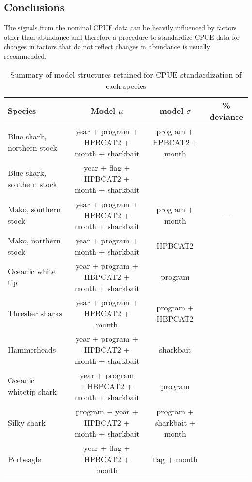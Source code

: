 \subsection{Conclusions}
The signals from the nominal  CPUE data can be heavily influenced by factors other than abundance and therefore a procedure to standardize CPUE data for changes in factors  that do not reflect changes in abundance is usually recommended. 

\clearpage
\begin{landscape}
\thispagestyle{empty}
 
\begin{table}[!h]
\caption{Summary of model structures retained for CPUE standardization of each species}
\begin{center}
\begin{tabular}{l|c|c|c}
Species & Model $\mu$& model $\sigma$ & \% deviance\\
\hline
\hline
Blue shark, northern stock  & year + program + HPBCAT2 + month + sharkbait & program + HPBCAT2 + month&\\
Blue shark, southern stock & year + flag + HPBCAT2 + month + sharkbait & \\ 
Mako, southern stock & year + program + HPBCAT2 + month + sharkbait & program + month & ---\\
Mako, northern stock & year + program + month + sharkbait & HPBCAT2 \\
Oceanic white tip & year + program + HBPCAT2 + month + sharkbait & program \\
Thresher sharks& year + program + HPBCAT2 + month & program + HBPCAT2 \\
Hammerheads& year + program + HPBCAT2 + month + sharkbait & sharkbait \\
Oceanic whitetip shark& year + program +HBPCAT2 + month + sharkbait & program\\
Silky shark & program + year + HPBCAT2 + month + sharkbait & program + sharkbait + month\\
Porbeagle & year + flag + HPBCAT2 + month & flag + month\\ 

\end{tabular}
\end{center}
\end{table}
\end{landscape}


\BSHnorthaic
\BSHsouthaic
\FALaic
\HHDaic
\MAKnorthaic
\MAKsouthaic
\OCSaic
\PORaic
\THRaic
%